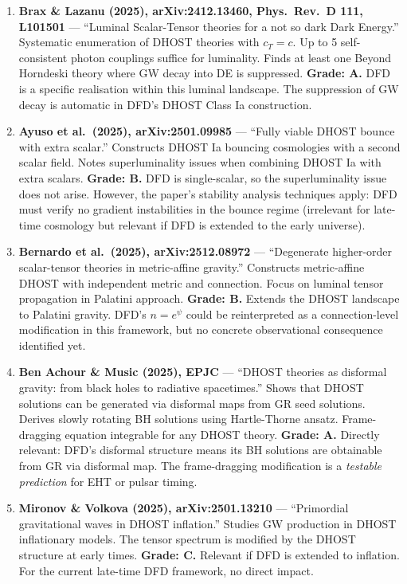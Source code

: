 \documentclass[11pt,a4paper]{article}
\begin{document}
\begin{enumerate}

\item \textbf{Brax \& Lazanu (2025), arXiv:2412.13460, Phys.\ Rev.\ D 111, L101501} --- ``Luminal Scalar-Tensor theories for a not so dark Dark Energy.'' Systematic enumeration of DHOST theories with $c_T = c$. Up to 5 self-consistent photon couplings suffice for luminality. Finds at least one Beyond Horndeski theory where GW decay into DE is suppressed. \textbf{Grade: A.} DFD is a specific realisation within this luminal landscape. The suppression of GW decay is automatic in DFD's DHOST Class Ia construction.

\item \textbf{Ayuso et al.\ (2025), arXiv:2501.09985} --- ``Fully viable DHOST bounce with extra scalar.'' Constructs DHOST Ia bouncing cosmologies with a second scalar field. Notes superluminality issues when combining DHOST Ia with extra scalars. \textbf{Grade: B.} DFD is single-scalar, so the superluminality issue does not arise. However, the paper's stability analysis techniques apply: DFD must verify no gradient instabilities in the bounce regime (irrelevant for late-time cosmology but relevant if DFD is extended to the early universe).

\item \textbf{Bernardo et al.\ (2025), arXiv:2512.08972} --- ``Degenerate higher-order scalar-tensor theories in metric-affine gravity.'' Constructs metric-affine DHOST with independent metric and connection. Focus on luminal tensor propagation in Palatini approach. \textbf{Grade: B.} Extends the DHOST landscape to Palatini gravity. DFD's $n = e^\psi$ could be reinterpreted as a connection-level modification in this framework, but no concrete observational consequence identified yet.

\item \textbf{Ben Achour \& Music (2025), EPJC} --- ``DHOST theories as disformal gravity: from black holes to radiative spacetimes.'' Shows that DHOST solutions can be generated via disformal maps from GR seed solutions. Derives slowly rotating BH solutions using Hartle-Thorne ansatz. Frame-dragging equation integrable for any DHOST theory. \textbf{Grade: A.} Directly relevant: DFD's disformal structure means its BH solutions are obtainable from GR via disformal map. The frame-dragging modification is a \emph{testable prediction} for EHT or pulsar timing.

\item \textbf{Mironov \& Volkova (2025), arXiv:2501.13210} --- ``Primordial gravitational waves in DHOST inflation.'' Studies GW production in DHOST inflationary models. The tensor spectrum is modified by the DHOST structure at early times. \textbf{Grade: C.} Relevant if DFD is extended to inflation. For the current late-time DFD framework, no direct impact.

\end{enumerate}
\end{document}
